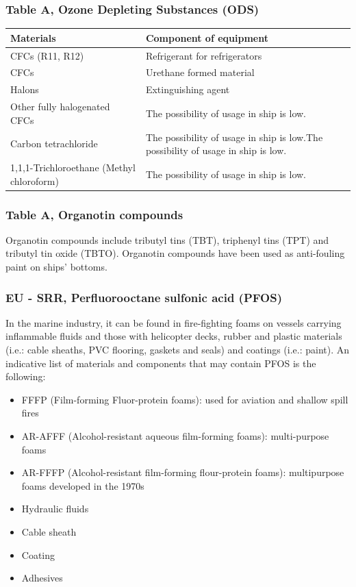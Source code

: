 \documentclass{article}
\begin{document}
\subsubsection{Table A, Ozone Depleting Substances (ODS)}
\renewcommand{\arraystretch}{1.4}
\begin{center}
\begin{table}[H]
\begin{tabular}{|l|l|}
\hline
\textbf{Materials} & \textbf{Component of equipment} \\ \hline
CFCs (R11, R12)        & Refrigerant for refrigerators              \\ \hline
CFCs          & Urethane formed material                  \\ \hline
Halons      & Extinguishing agent                 \\ \hline
Other fully halogenated CFCs   & The possibility of usage in ship is low.       \\ \hline
Carbon tetrachloride    &        The possibility of usage in ship is low.The possibility of usage in ship is low.                         \\ \hline
1,1,1-Trichloroethane (Methyl
chloroform)          &              The possibility of usage in ship is low.                   \\ \hline
\end{tabular}
\end{table}
\end{center}

\subsubsection{Table A, Organotin compounds}
Organotin compounds include tributyl tins (TBT), triphenyl tins (TPT) and tributyl
tin oxide (TBTO). Organotin compounds have been used as anti-fouling paint on
ships' bottoms.

\subsubsection{EU - SRR, Perfluorooctane sulfonic acid (PFOS)}
In the marine industry, it can be found in fire-fighting foams on vessels carrying
inflammable fluids and those with helicopter decks, rubber and plastic materials
(i.e.: cable sheaths, PVC flooring, gaskets and seals) and coatings (i.e.: paint). An
indicative list of materials and components that may contain PFOS is the
following:
\begin{itemize}
    \item FFFP (Film-forming Fluor-protein foams): used for aviation and shallow spill
fires
\item AR-AFFF (Alcohol-resistant aqueous film-forming foams): multi-purpose
foams
\item AR-FFFP (Alcohol-resistant film-forming flour-protein foams): multipurpose
foams developed in the 1970s
\item Hydraulic fluids
\item Cable sheath
\item Coating
\item Adhesives
\end{itemize}
\end{document}
